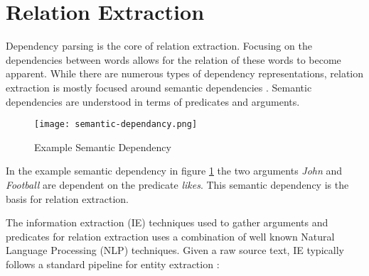\documentclass[bsc,frontabs,twoside,singlespacing,parskip,deptreport]{infthesis}     %
\begin{document}
\section{Relation Extraction}\label{sec:IE-bg}
Dependency parsing is the core of relation extraction. Focusing on the dependencies between words allows for the relation of these words to become apparent.
While there are numerous types of dependency representations, relation extraction is mostly focused around semantic dependencies \cite{mcclosky2011event}.
Semantic dependencies are understood in terms of predicates and arguments.
\begin{figure}[H]
  \centering
  \texttt{[image: semantic-dependancy.png]}
  \caption{Example Semantic Dependency}
  \label{fig:semantic-dependancy}
\end{figure}

In the example semantic dependency in figure \ref{fig:semantic-dependancy} the two arguments \textit{John} and \textit{Football} are dependent
on the predicate \textit{likes}. This semantic dependency is the basis for relation extraction.


The information extraction (IE) techniques used to gather arguments and predicates for relation extraction uses a combination
of well known Natural Language Processing (NLP) techniques. 
Given a raw source text, IE typically follows a standard pipeline for entity extraction \cite{bontcheva2013twitie}:\\
\end{document}
